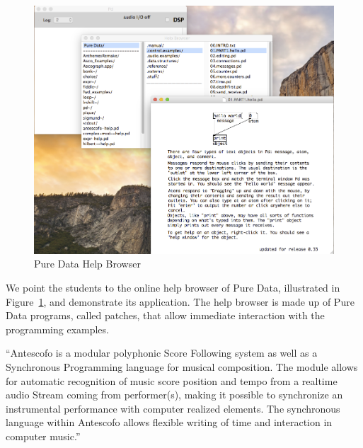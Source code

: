 \documentclass[onecolumn,nocopyrightspace,preprint]{sigplanconf}
\begin{document}
\begin{description}
\begin{figure}[t]
    \centering
    \includegraphics[scale=0.4]{fig/pd-help-browser.png}
    \caption{Pure Data Help Browser}
    \label{fig:pd-help-browser}
\end{figure}

We point the students to the online help browser of Pure Data, illustrated in
Figure~\ref{fig:pd-help-browser}, and demonstrate its application. The help
browser is made up of Pure Data programs, called patches, that allow immediate
interaction with the programming examples.

``Antescofo is a modular polyphonic Score Following system as well as a
Synchronous Programming language for musical composition. The module allows
for automatic recognition of music score position and tempo from a realtime
audio Stream coming from performer(s), making it possible to synchronize an
instrumental performance with computer realized elements. The synchronous
language within Antescofo allows flexible writing of time and interaction in
computer music.''~\cite{website:antescofo}


\end{description}
\end{document}
